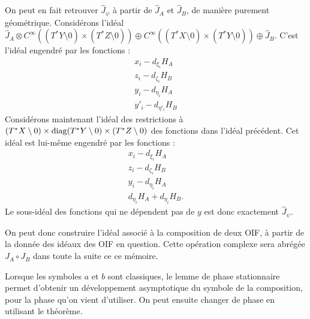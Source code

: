 On peut en fait retrouver $\hat{J}_{\psi}$ à partir de $\hat{J}_A$ et $\hat{J}_B$, de manière purement géométrique. Considérons l'idéal $\hat{J}_A \otimes C^{\infty}((T^*Y\setminus 0)\times (T^*Z\setminus 0)) \oplus C^{\infty}((T^*X\setminus 0)\times (T^*Y\setminus 0)) \oplus \hat{J}_B$. C'est l'idéal engendré par les fonctions :
\begin{align*}
	x_i-d_{\xi_i}H_A\\
	z_i-d_{\zeta_i}H_B\\
	y_i-d_{\eta_i}H_A\\
	y'_i - d_{\eta'_i}H_B
\end{align*}
Considérons maintenant l'idéal des restrictions à $(T^*X\setminus 0)\times \operatorname{diag} (T^*Y\setminus 0) \times (T^*Z\setminus 0)$ des fonctions dans l'idéal précédent. Cet idéal est lui-même engendré par les fonctions :
\begin{align*}
x_i-d_{\xi_i}H_A\\
z_i-d_{\zeta_i}H_B\\
y_i-d_{\eta_i}H_A\\
d_{\eta_i}H_A+ d_{\eta_i}H_B.
\end{align*}
Le sous-idéal des fonctions qui ne dépendent pas de $y$ est donc exactement $\hat{J}_{\psi}$.

On peut donc construire l'idéal associé à la composition de deux OIF, à partir de la donnée des idéaux des OIF en question. Cette opération complexe sera abrégée $J_A\circ J_B$ dans toute la suite ce ce mémoire.

\begin{rem}
	Lorsque les symboles $a$ et $b$ sont classiques, le lemme de phase stationnaire permet d'obtenir un développement asymptotique du symbole de la composition, pour la phase qu'on vient d'utiliser. On peut ensuite changer de phase en utilisant le théorème.
\end{rem}

